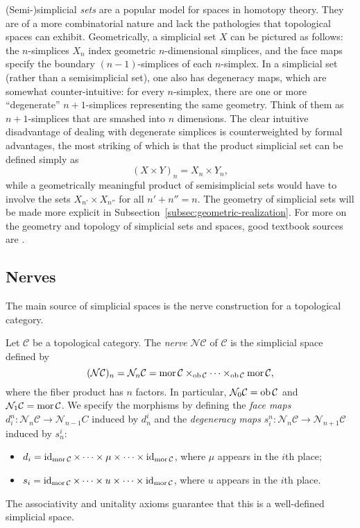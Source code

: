 \documentclass[a4paper,openany]{scrbook}
\renewcommand{\C}{\mathcal C}
\newcommand{\nerve}{\mathcal N}
\begin{document}
(Semi-)simplicial \emph{sets} are a popular model for spaces in homotopy theory. They are of a more combinatorial nature and lack the pathologies that topological spaces can exhibit. Geometrically, a simplicial set $X$ can be pictured as follows: the $n$-simplices $X_n$ index geometric $n$-dimensional simplices, and the face maps specify the boundary $(n-1)$-simplices of each $n$-simplex. In a simplicial set (rather than a semisimplicial set), one also has degeneracy maps, which are somewhat counter-intuitive: for every $n$-simplex, there are one or more ``degenerate'' $n+1$-simplices representing the same geometry. Think of them as $n+1$-simplices that are smashed into $n$ dimensions. The clear intuitive disadvantage of dealing with degenerate simplices is counterweighted by formal advantages, the most striking of which is that the product simplicial set can be defined simply as
\[
(X \times Y)_n = X_n \times Y_n,
\]
while a geometrically meaningful product of semisimplicial sets would have to involve the sets $X_{n'} \times X_{n''}$ for all $n'+n''=n$. The geometry of simplicial sets will be made more explicit in Subsection~\ref{subsec:geometric-realization}. For more on the geometry and topology of simplicial sets and spaces, good textbook sources are \cite{goerss-jardine,may:simplicial-objects}.


\subsection{Nerves}\label{subsec:nerve}

The main source of simplicial spaces is the nerve construction for a topological category.


\begin{defn}
Let $\C$ be a topological category. The \emph{nerve} $\nerve\C$ of $\C$ is the simplicial space defined by
\[
(\nerve\C)_n = \nerve_n\C = \mor \C \times_{\ob \C} \cdots \times_{\ob \C} \mor\C,
\]
where the fiber product has $n$ factors. In particular, $\nerve_0 \C = \ob \C$ and $\nerve_1 \C = \mor \C$. We specify the morphisms by defining the \emph{face maps} $d_i^n\colon \nerve_n \C \to \nerve_{n-1} C$ induced by $d^i_n$ and the \emph{degeneracy maps} $s_i^n\colon \nerve_n \C \to \nerve_{n+1} \C$ induced by $s^i_n$:
\begin{itemize}
\item $d_i = \id_{\mor \C} \times \cdots \times \mu \times \cdots \times \id_{\mor \C}$, where $\mu$ appears in the $i$th place;
\item $s_i = \id_{\mor \C} \times \cdots \times u \times \cdots \times \id_{\mor \C}$, where $u$ appears in the $i$th place.
\end{itemize}
The associativity and unitality axioms guarantee that this is a well-defined simplicial space.
\end{defn}
\end{document}
